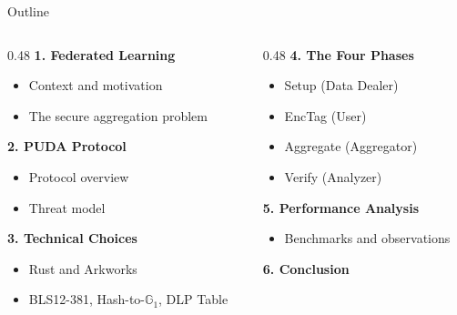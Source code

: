 \documentclass[aspectratio=169,10pt]{beamer}
\newcommand{\G}{\mathbb{G}}
\begin{document}
\begin{frame}{Outline}
    \begin{columns}[T]
        \begin{column}{0.48\textwidth}
            \textbf{1. Federated Learning}
            \begin{itemize}
                \item Context and motivation
                \item The secure aggregation problem
            \end{itemize}

            \vspace{0.5em}
            \textbf{2. PUDA Protocol}
            \begin{itemize}
                \item Protocol overview
                \item Threat model
            \end{itemize}

            \vspace{0.5em}
            \textbf{3. Technical Choices}
            \begin{itemize}
                \item Rust and Arkworks
                \item BLS12-381, Hash-to-$\G_1$, DLP Table
            \end{itemize}
        \end{column}
        \begin{column}{0.48\textwidth}
            \textbf{4. The Four Phases}
            \begin{itemize}
                \item Setup (Data Dealer)
                \item EncTag (User)
                \item Aggregate (Aggregator)
                \item Verify (Analyzer)
            \end{itemize}

            \vspace{0.5em}
            \textbf{5. Performance Analysis}
            \begin{itemize}
                \item Benchmarks and observations
            \end{itemize}

            \vspace{0.5em}
            \textbf{6. Conclusion}
        \end{column}
    \end{columns}
\end{frame}
\end{document}
